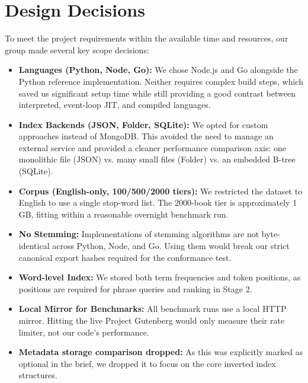 \documentclass[12pt,a4paper]{article}
\begin{document}
	\section{Design Decisions}
	To meet the project requirements within the available time and resources, our group made several key scope decisions:
	\begin{itemize}
		\item \textbf{Languages (Python, Node, Go):} We chose Node.js and Go alongside the Python reference implementation. Neither requires complex build steps, which saved us significant setup time while still providing a good contrast between interpreted, event-loop JIT, and compiled languages.
		\item \textbf{Index Backends (JSON, Folder, SQLite):} We opted for custom approaches instead of MongoDB. This avoided the need to manage an external service and provided a cleaner performance comparison axis: one monolithic file (JSON) vs. many small files (Folder) vs. an embedded B-tree (SQLite).
		\item \textbf{Corpus (English-only, 100/500/2000 tiers):} We restricted the dataset to English to use a single stop-word list. The 2000-book tier is approximately 1 GB, fitting within a reasonable overnight benchmark run.
		\item \textbf{No Stemming:} Implementations of stemming algorithms are not byte-identical across Python, Node, and Go. Using them would break our strict canonical export hashes required for the conformance test.
		\item \textbf{Word-level Index:} We stored both term frequencies and token positions, as positions are required for phrase queries and ranking in Stage 2.
		\item \textbf{Local Mirror for Benchmarks:} All benchmark runs use a local HTTP mirror. Hitting the live Project Gutenberg would only measure their rate limiter, not our code's performance.
		\item \textbf{Metadata storage comparison dropped:} As this was explicitly marked as optional in the brief, we dropped it to focus on the core inverted index structures.
	\end{itemize}
	
\end{document}
